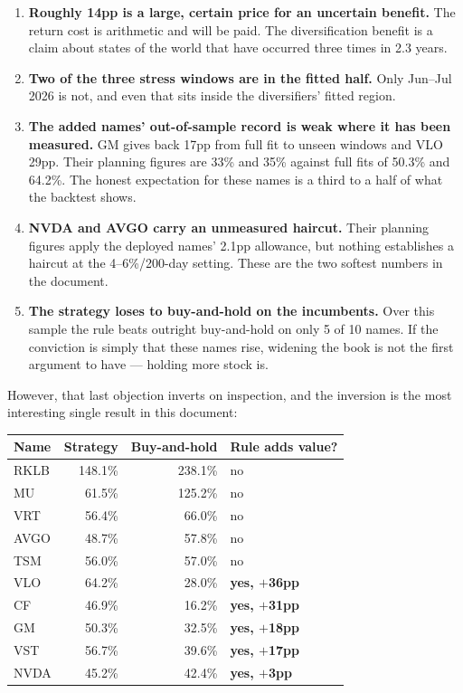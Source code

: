 \documentclass[11pt]{article}
\newcommand{\pc}[1]{#1\%}
\begin{document}
\begin{enumerate}[leftmargin=1.4em,itemsep=4pt]
  \item \textbf{Roughly 14pp is a large, certain price for an uncertain benefit.} The return
        cost is arithmetic and will be paid. The diversification benefit is a claim about states
        of the world that have occurred three times in 2.3 years.
  \item \textbf{Two of the three stress windows are in the fitted half.} Only Jun--Jul 2026 is
        not, and even that sits inside the diversifiers' fitted region.
  \item \textbf{The added names' out-of-sample record is weak where it has been measured.}
        GM gives back 17pp from full fit to unseen windows and VLO 29pp. Their planning figures
        are \pc{33} and \pc{35} against full fits of \pc{50.3} and \pc{64.2}. The honest
        expectation for these names is a third to a half of what the backtest shows.
  \item \textbf{NVDA and AVGO carry an unmeasured haircut.} Their planning figures apply the
        deployed names' 2.1pp allowance, but nothing establishes a haircut at the 4--6\%/200-day
        setting. These are the two softest numbers in the document.
  \item \textbf{The strategy loses to buy-and-hold on the incumbents.} Over this sample the
        rule beats outright buy-and-hold on only 5 of 10 names. If the conviction is simply that
        these names rise, widening the book is not the first argument to have --- holding more
        stock is.
\end{enumerate}

\noindent However, that last objection inverts on inspection, and the inversion is the most
interesting single result in this document:

\begin{table}[H]\centering\small
\begin{tabular}{lrrl}
\toprule
\textbf{Name} & \textbf{Strategy} & \textbf{Buy-and-hold} & \textbf{Rule adds value?} \\
\midrule
RKLB & 148.1\% & 238.1\% & no \\
MU   &  61.5\% & 125.2\% & no \\
VRT  &  56.4\% &  66.0\% & no \\
AVGO &  48.7\% &  57.8\% & no \\
TSM  &  56.0\% &  57.0\% & no \\
\midrule
\rowcolor{bckeep} VLO  &  64.2\% & 28.0\% & \textbf{yes, $+$36pp} \\
\rowcolor{bckeep} CF   &  46.9\% & 16.2\% & \textbf{yes, $+$31pp} \\
\rowcolor{bckeep} GM   &  50.3\% & 32.5\% & \textbf{yes, $+$18pp} \\
\rowcolor{bckeep} VST  &  56.7\% & 39.6\% & \textbf{yes, $+$17pp} \\
\rowcolor{bckeep} NVDA &  45.2\% & 42.4\% & \textbf{yes, $+$3pp} \\
\bottomrule
\end{tabular}
\end{table}
\end{document}
